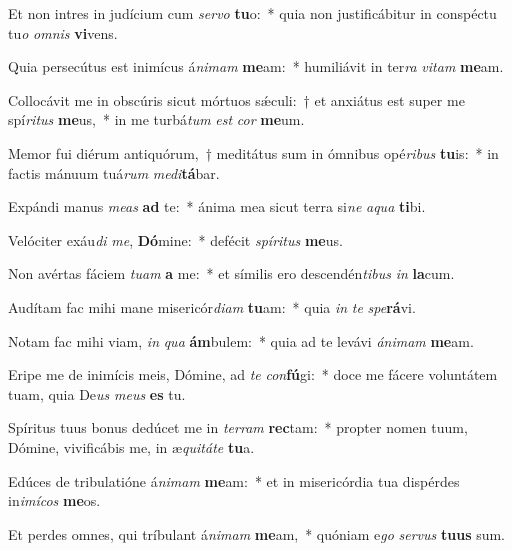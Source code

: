 \item Et non intres in judícium cum \textit{ser}\textit{vo} \textbf{tu}o:~* quia non justificábitur in conspéctu tu\textit{o} \textit{om}\textit{nis} \textbf{vi}vens.
\item Quia persecútus est inimícus á\textit{ni}\textit{mam} \textbf{me}am:~* humiliávit in ter\textit{ra} \textit{vi}\textit{tam} \textbf{me}am.
\item Collocávit me in obscúris sicut mórtuos sǽculi:~† et anxiátus est super me spí\textit{ri}\textit{tus} \textbf{me}us,~* in me turbá\textit{tum} \textit{est} \textit{cor} \textbf{me}um.
\item Memor fui diérum antiquórum,~† meditátus sum in ómnibus opé\textit{ri}\textit{bus} \textbf{tu}is:~* in factis mánuum tuá\textit{rum} \textit{me}\textit{di}\textbf{tá}bar.
\item Expándi manus \textit{me}\textit{as} \textbf{ad} te:~* ánima mea sicut terra si\textit{ne} \textit{a}\textit{qua} \textbf{ti}bi.
\item Velóciter exáu\textit{di} \textit{me}, \textbf{Dó}mine:~* defécit \textit{spí}\textit{ri}\textit{tus} \textbf{me}us.
\item Non avértas fáciem \textit{tu}\textit{am} \textbf{a} me:~* et símilis ero descendén\textit{ti}\textit{bus} \textit{in} \textbf{la}cum.
\item Audítam fac mihi mane misericór\textit{di}\textit{am} \textbf{tu}am:~* quia \textit{in} \textit{te} \textit{spe}\textbf{rá}vi.
\item Notam fac mihi viam, \textit{in} \textit{qua} \textbf{ám}bulem:~* quia ad te levávi \textit{á}\textit{ni}\textit{mam} \textbf{me}am.
\item Eripe me de inimícis meis, Dómine, ad \textit{te} \textit{con}\textbf{fú}gi:~* doce me fácere voluntátem tuam, quia De\textit{us} \textit{me}\textit{us} \textbf{es} tu.
\item Spíritus tuus bonus dedúcet me in \textit{ter}\textit{ram} \textbf{rec}tam:~* propter nomen tuum, Dómine, vivificábis me, in æ\textit{qui}\textit{tá}\textit{te} \textbf{tu}a.
\item Edúces de tribulatióne á\textit{ni}\textit{mam} \textbf{me}am:~* et in misericórdia tua dispérdes in\textit{i}\textit{mí}\textit{cos} \textbf{me}os.
\item Et perdes omnes, qui tríbulant á\textit{ni}\textit{mam} \textbf{me}am,~* quóniam e\textit{go} \textit{ser}\textit{vus} \textbf{tu}\textbf{us} sum.
